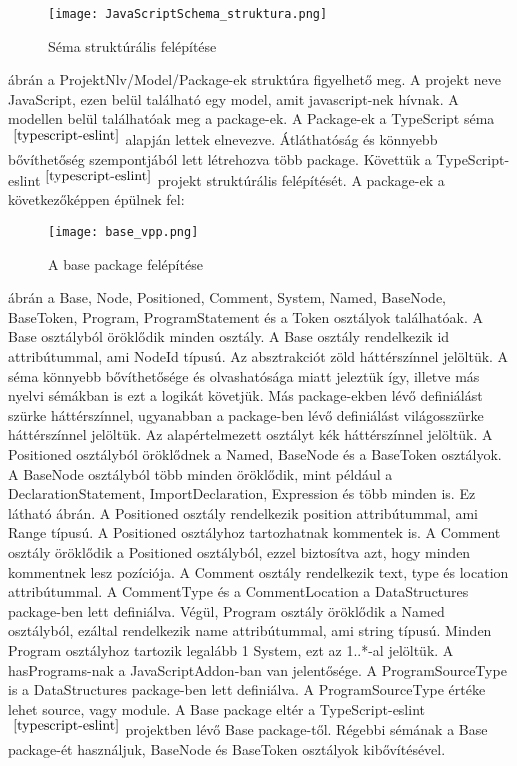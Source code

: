 \begin{figure}[!htbp]
      \caption{Séma struktúrális felépítése}\label{fig:JavaScriptSchema_struktura}
      \centering
      \texttt{[image: JavaScriptSchema\_struktura.png]}
\end{figure}

 ábrán a ProjektNlv/Model/Package-ek struktúra figyelhető meg.
A projekt neve JavaScript, ezen belül található egy model, amit javascript-nek hívnak.
A modellen belül találhatóak meg a package-ek.
A Package-ek a TypeScript séma $^{~\cite{typescript-eslint}}$ alapján lettek elnevezve.
Átláthatóság és könnyebb bővíthetőség szempontjából lett létrehozva több package.
Követtük a TypeScript-eslint$^{~\cite{typescript-eslint}}$ projekt struktúrális felépítését.
A package-ek a következőképpen épülnek fel:
\begin{figure}[!htbp]
      \caption{A base package felépítése}\label{fig:base_vpp}
      \centering
      \texttt{[image: base\_vpp.png]}
\end{figure}

 ábrán a Base, Node, Positioned, Comment, System, Named, BaseNode, BaseToken, Program, ProgramStatement és a Token osztályok találhatóak.
A Base osztályból öröklődik minden osztály.
A Base osztály rendelkezik id attribútummal, ami NodeId típusú.
Az absztrakciót zöld háttérszínnel jelöltük.
A séma könnyebb bővíthetősége és olvashatósága miatt jeleztük így, illetve más nyelvi sémákban is ezt a logikát követjük.
Más package-ekben lévő definiálást szürke háttérszínnel, ugyanabban a package-ben lévő definiálást világosszürke háttérszínnel jelöltük.
Az alapértelmezett osztályt kék háttérszínnel jelöltük.
A Positioned osztályból öröklődnek a Named, BaseNode és a BaseToken osztályok.
A BaseNode osztályból több minden öröklődik, mint például a DeclarationStatement, ImportDeclaration, Expression és több minden is. Ez látható  ábrán.
A Positioned osztály rendelkezik position attribútummal, ami Range típusú. A Positioned osztályhoz tartozhatnak kommentek is.
A Comment osztály öröklődik a Positioned osztályból, ezzel biztosítva azt, hogy minden kommentnek lesz pozíciója.
A Comment osztály rendelkezik text, type és location attribútummal.
A CommentType és a CommentLocation a DataStructures package-ben lett definiálva.
Végül, Program osztály öröklődik a Named osztályból, ezáltal rendelkezik name attribútummal, ami string típusú.
Minden Program osztályhoz tartozik legalább 1 System, ezt az 1..*-al jelöltük.
A hasPrograms-nak a JavaScriptAddon-ban van jelentősége.
A ProgramSourceType is a DataStructures package-ben lett definiálva. A ProgramSourceType értéke lehet source, vagy module.
A Base package eltér a TypeScript-eslint$^{~\cite{typescript-eslint}}$ projektben lévő Base package-től.
Régebbi sémának a Base package-ét használjuk, BaseNode és BaseToken osztályok kibővítésével.

